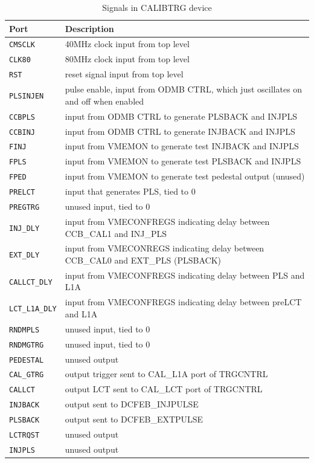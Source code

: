 \documentclass[10pt,a4paper]{article}
\begin{document}
\begin{table}[H]
\centering
\begin{tabular}{|l|l|} \hline
Port& Description\\ \hline
\texttt{CMSCLK}& 40MHz clock input from top level\\ \hline
\texttt{CLK80}& 80MHz clock input from top level\\ \hline
\texttt{RST}& reset signal input from top level\\ \hline
\texttt{PLSINJEN}& pulse enable, input from ODMB CTRL, which just oscillates on and off when enabled\\ \hline
\texttt{CCBPLS}& input from ODMB CTRL to generate PLSBACK and INJPLS\\ \hline
\texttt{CCBINJ}& input from ODMB CTRL to generate INJBACK and INJPLS\\ \hline
\texttt{FINJ}& input from VMEMON to generate test INJBACK and INJPLS\\ \hline
\texttt{FPLS}& input from VMEMON to generate test PLSBACK and INJPLS\\ \hline
\texttt{FPED}& input from VMEMON to generate test pedestal output (unused)\\ \hline
\texttt{PRELCT}& input that generates PLS, tied to 0\\ \hline
\texttt{PREGTRG}& unused input, tied to 0\\ \hline
\texttt{INJ\_DLY}& input from VMECONFREGS indicating delay between CCB\_CAL1 and INJ\_PLS\\ \hline
\texttt{EXT\_DLY}& input from VMECONREGS indicating delay between CCB\_CAL0 and EXT\_PLS (PLSBACK)\\ \hline
\texttt{CALLCT\_DLY}& input from VMECONFREGS indicating delay between PLS and L1A\\ \hline
\texttt{LCT\_L1A\_DLY}& input from VMECONFREGS indicating delay between preLCT and L1A\\ \hline
\texttt{RNDMPLS}& unused input, tied to 0\\ \hline
\texttt{RNDMGTRG}& unused input, tied to 0\\ \hline
\texttt{PEDESTAL}& unused output\\ \hline
\texttt{CAL\_GTRG}& output trigger sent to CAL\_L1A port of TRGCNTRL\\ \hline
\texttt{CALLCT}& output LCT sent to CAL\_LCT port of TRGCNTRL\\ \hline
\texttt{INJBACK}& output sent to DCFEB\_INJPULSE\\ \hline
\texttt{PLSBACK}& output sent to DCFEB\_EXTPULSE\\ \hline
\texttt{LCTRQST}& unused output\\ \hline
\texttt{INJPLS}& unused output\\ \hline
\end{tabular}
\caption{Signals in CALIBTRG device}
\label{tab:calibtriginterface}
\end{table}
\end{document}
